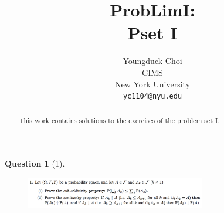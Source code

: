 \documentclass{article} %
\title{ProbLimI: \\
Pset I}
\author{
Youngduck Choi \\
CIMS \\
New York University\\
\texttt{yc1104@nyu.edu} \\
}
\theoremstyle{quest}
\newtheorem*{question}{Question}
\begin{document}
\maketitle

\begin{abstract}
This work contains solutions to the exercises of the problem set I.
\end{abstract}

\bigskip

\begin{question}[1]
\hfill
\begin{figure}[h!]
  \centering
    \includegraphics[width=0.7\textwidth]{problim-e1-p1.png}
\end{figure}
\end{question}
\end{document}
